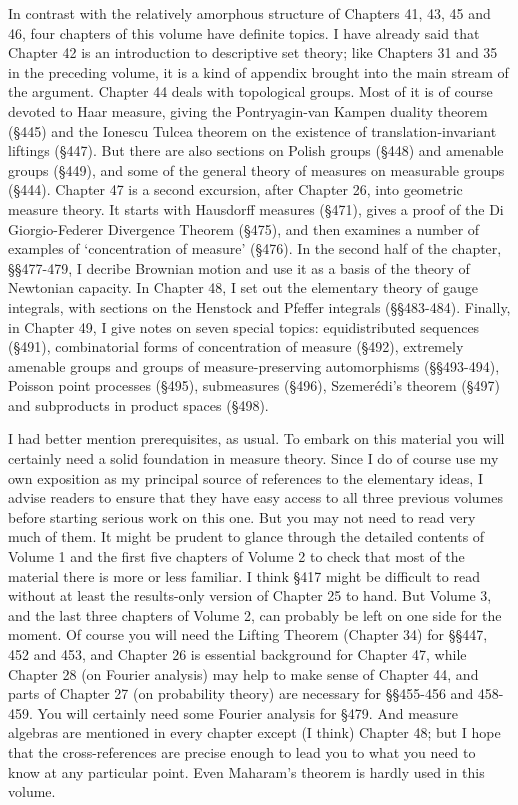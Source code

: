 In contrast with the relatively amorphous structure of Chapters 41, 43,
45 and 46, four chapters of this volume have definite topics.
I have already said that Chapter 42 is an introduction to descriptive
set theory;  like Chapters 31 and 35 in the preceding volume, it is a 
kind of
appendix brought into the main stream of the argument.   Chapter 44
deals with topological groups.   Most of it is of course devoted to Haar
measure, giving the Pontryagin-van Kampen duality theorem (\S445) and
the Ionescu Tulcea theorem on the existence of translation-invariant
liftings (\S447).   But there are also sections on Polish groups
(\S448) and amenable groups (\S449), and some of the general theory of
measures on measurable groups
(\S444).   Chapter 47 is a second excursion, after Chapter 26, into
geometric measure theory.   It starts with Hausdorff measures (\S471),
gives a proof of the Di Giorgio-Federer
Divergence Theorem (\S475), and then examines a number of examples of
`concentration of measure' (\S476).   In the second half of the chapter,
\S\S477-479, I decribe Brownian motion and use it as a basis of 
the theory of Newtonian capacity.
In Chapter 48, I set out the elementary theory of gauge integrals, with
sections on the Henstock and Pfeffer integrals (\S\S483-484).
Finally, in Chapter 49, I give notes on seven special topics:
equidistributed sequences (\S491),
combinatorial forms of concentration of measure (\S492),
extremely amenable groups and groups of measure-preserving automorphisms
(\S\S493-494),
Poisson point processes (\S495),
submeasures (\S496), Szemer\'edi's theorem (\S497) and
subproducts in product spaces (\S498).

I had better mention prerequisites, as usual.   To embark on this
material you will certainly need a solid foundation in measure theory.
Since I do of course use my own exposition as my principal source of
references to the elementary ideas, I advise readers to ensure that they
have easy access to all three previous volumes before starting serious
work on this one.   But you may not need to read very much of them.   It
might be prudent to glance through the detailed contents of Volume 1 and
the first five chapters of Volume 2 to
check that most of the material there is more or less familiar.   I think
\S417 might be difficult to read without at least the results-only version
of Chapter 25 to hand.   But
Volume 3, and the last three chapters of Volume 2, can probably be left
on one side for the moment.   Of course you will need the
Lifting Theorem (Chapter 34) for \S\S447, 452 and 453, and Chapter
26 is essential background for Chapter 47, while Chapter 28 (on Fourier
analysis) may help to make sense of Chapter 44, and parts of Chapter 27
(on probability theory) are necessary for \S\S455-456 and 458-459.
You will certainly need some Fourier analysis for \S479.
And measure algebras
are mentioned in every chapter except (I think) Chapter 48;  but I hope
that the cross-references are precise enough to lead you to what
you need to know at any particular point.   Even Maharam's theorem is
hardly used in this volume.

